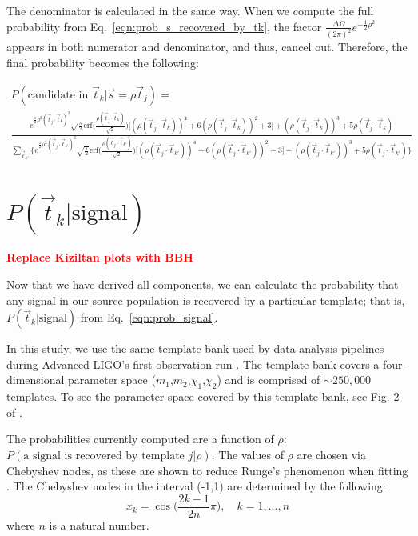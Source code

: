 \documentclass[twocolumn,showpacs,unsortedaddress,superscriptaddress,showkeys,nofootinbib,preprintnumbers,letterpaper]{revtex4-1}
\newcommand{\FIXME}[1]{\textcolor{red}{\textbf{#1}}}
\newcommand{\ptjtk}{\rho(\vec{t}_j\cdot\vec{t}_k)}
\newcommand{\tjtk}{(\vec{t}_j\cdot\vec{t}_k)}
\newcommand{\tjtkk}{(\vec{t}_j\cdot\vec{t}_{k'})}
\newcommand{\ptjtkk}{\rho(\vec{t}_j\cdot\vec{t}_{k'})}
\begin{document}
The denominator is calculated in the same way. When we compute the full probability from Eq.~\ref{eqn:prob_s_recovered_by_tk}, the factor $\frac{\Delta\Omega}{(2\pi)^{2}} e^{-\frac{1}{2}\rho^2}$ appears in both numerator and denominator, and thus, cancel out. Therefore, the final probability becomes the following:
	\begin{widetext}
	\begin{multline}
	P(\text{candidate in }\vec{t}_k|\vec{s}=\rho\vec{t}_j) =\\
	\frac{
	e^{\frac{1}{2}\rho^2\tjtk^2}
	\sqrt{\frac{\pi}{2}}\text{erf}\Big(\frac{\ptjtk}{\sqrt{2}}\Big)\Big[(\ptjtk)^4+6(\ptjtk)^2+3\Big]
	      + (\ptjtk)^3+5\ptjtk
	}{
	{\sum_{\vec{t}_{k'}} \Big\{e^{\frac{1}{2}\rho^2\tjtkk^2} 
	\sqrt{\frac{\pi}{2}}\text{erf}\Big(\frac{\ptjtkk}{\sqrt{2}}\Big)\Big[(\ptjtkk)^4+6(\ptjtkk)^2+3\Big]
	      + (\ptjtkk)^3+5\ptjtkk
	\Big\}
	}}
	\label{eqn:p_k}
	\end{multline}
	\end{widetext}


\section{$P(\vec{t}_k | \text{signal})$} \label{sec:P_jk}

\FIXME{Replace Kiziltan plots with BBH}

Now that we have derived all components, we can calculate the probability that any signal in our source population is recovered by a particular template; that is, $P(\vec{t}_k | \text{signal})$ from Eq.~\ref{eqn:prob_signal}.

In this study, we use the same template bank used by data analysis pipelines during Advanced LIGO's first observation run \cite{TheLIGOScientific:2016pea}. The template bank covers a four-dimensional parameter space ($m_1$,$m_2$,$\chi_1$,$\chi_2$) and is comprised of $\sim\!250,000$ templates. To see the parameter space covered by this template bank, see Fig. 2 of \cite{TheLIGOScientific:2016pea}.

The probabilities currently computed are a function of $\rho$: $P(\text{a signal is recovered by template }j|\rho)$. The values of $\rho$ are chosen via Chebyshev nodes, as these are shown to reduce Runge's phenomenon when fitting \cite{numericalmethodsMATLAB}. The Chebyshev nodes in the interval (-1,1) are determined by the following:
	\begin{equation}
	x_k = \cos\Big(\frac{2k-1}{2n}\pi\Big), \quad k=1,...,n
	\end{equation}
where $n$ is a natural number. 
\end{document}
